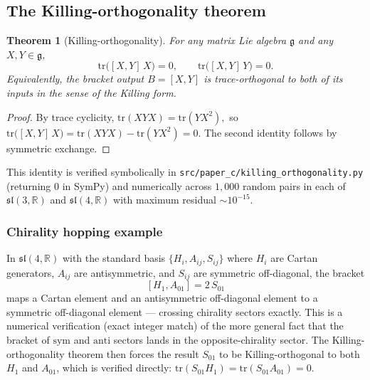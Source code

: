 \documentclass[11pt,a4paper]{article}
\theoremstyle{plain}
\newtheorem{theorem}{Theorem}[section]
\theoremstyle{definition}
\theoremstyle{remark}
\begin{document}
\subsection{The Killing-orthogonality theorem}
\label{sec:killing}

\begin{theorem}[Killing-orthogonality]\label{thm:killing}
For any matrix Lie algebra $\mathfrak{g}$ and any $X, Y \in \mathfrak{g}$,
\begin{equation}\label{eq:killing-orth}
  \mathrm{tr}\bigl([X, Y]\,X\bigr) = 0,
  \qquad
  \mathrm{tr}\bigl([X, Y]\,Y\bigr) = 0.
\end{equation}
Equivalently, the bracket output $B = [X, Y]$ is trace-orthogonal to
both of its inputs in the sense of the Killing form.
\end{theorem}

\begin{proof}
By trace cyclicity,
\(
  \mathrm{tr}(XYX) = \mathrm{tr}(YX^2),
\)
so
\(
  \mathrm{tr}\bigl([X,Y]\,X\bigr) = \mathrm{tr}(XYX) - \mathrm{tr}(YX^2) = 0.
\)
The second identity follows by symmetric exchange.
\end{proof}

\noindent
This identity is verified symbolically in
\texttt{src/paper\_c/killing\_orthogonality.py} (returning
$0$ in SymPy) and numerically across $1{,}000$ random pairs in each
of $\mathfrak{sl}(3,\mathbb{R})$ and $\mathfrak{sl}(4,\mathbb{R})$
with maximum residual $\sim 10^{-15}$.

\subsubsection*{Chirality hopping example}

In $\mathfrak{sl}(4,\mathbb{R})$ with the standard basis
$\{H_i, A_{ij}, S_{ij}\}$ where $H_i$ are Cartan generators,
$A_{ij}$ are antisymmetric, and $S_{ij}$ are symmetric off-diagonal,
the bracket
\begin{equation}\label{eq:chirality-hopping}
  [H_1, A_{01}] = 2\,S_{01}
\end{equation}
maps a Cartan element and an antisymmetric off-diagonal element to
a symmetric off-diagonal element --- crossing chirality sectors
exactly.  This is a numerical verification (exact integer match) of
the more general fact that the bracket of $\mathrm{sym}$ and
$\mathrm{anti}$ sectors lands in the opposite-chirality sector.
The Killing-orthogonality theorem then forces the result $S_{01}$ to
be Killing-orthogonal to both $H_1$ and $A_{01}$, which is verified
directly: $\mathrm{tr}(S_{01} H_1) = \mathrm{tr}(S_{01} A_{01}) = 0$.
\end{document}
